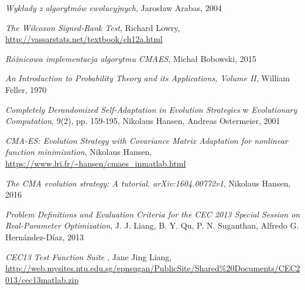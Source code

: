 \documentclass{mini}
\begin{document}
\begin{thebibliography}{9}

\emph{Wykłady z algorytmów ewolucyjnych}, Jarosław Arabas, 2004

\emph{The Wilcoxon Signed-Rank Test}, Richard Lowry, \url{http://vassarstats.net/textbook/ch12a.html}

\emph{Różnicowa implementacja algorytmu CMAES}, Michał Bobowski, 2015

\emph{An Introduction to Probability Theory and its Applications, Volume II}, William Feller, 1970

\emph{Completely Derandomized Self-Adaptation in Evolution Strategies} w \emph{Evolutionary Computation}, 9(2), pp. 159-195, Nikolaus Hansen, Andreas Ostermeier, 2001

\emph{CMA-ES: Evolution Strategy with Covariance Matrix Adaptation for nonlinear function minimization}, Nikolaus Hansen, \url{https://www.lri.fr/~hansen/cmaes\_inmatlab.html}

\emph{The CMA evolution strategy: A tutorial. arXiv:1604.00772v1}, Nikolaus Hansen, 2016

\emph{Problem Definitions and Evaluation Criteria for the CEC 2013 Special Session on Real-Parameter Optimization}, J. J. Liang, B. Y. Qu, P. N. Suganthan, Alfredo G. Hernández-Díaz, 2013

\emph{CEC13 Test Function Suite }, Jane Jing Liang, \url{http://web.mysites.ntu.edu.sg/epnsugan/PublicSite/Shared%20Documents/CEC2013/cec13matlab.zip}

\end{thebibliography}

\makestatement
\end{document}
